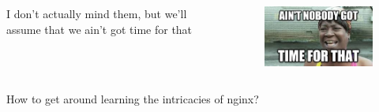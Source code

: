 \documentclass{beamer}
\begin{document}
\begin{frame}
    \begin{columns}
        \begin{column}{0.5\textwidth}
            I don't actually mind them, but we'll assume that we ain't got time for that
        \end{column}
        \begin{column}{0.5\textwidth}
            \begin{figure}
                \centering
                \includegraphics[width=\textwidth,keepaspectratio]{../resources/nobody_got_time.jpg}
            \end{figure}
        \end{column}
    \end{columns}
\end{frame}

\begin{frame}
    \begin{center}
        How to get around learning the intricacies of nginx?
    \end{center}
\end{frame}
\end{document}
